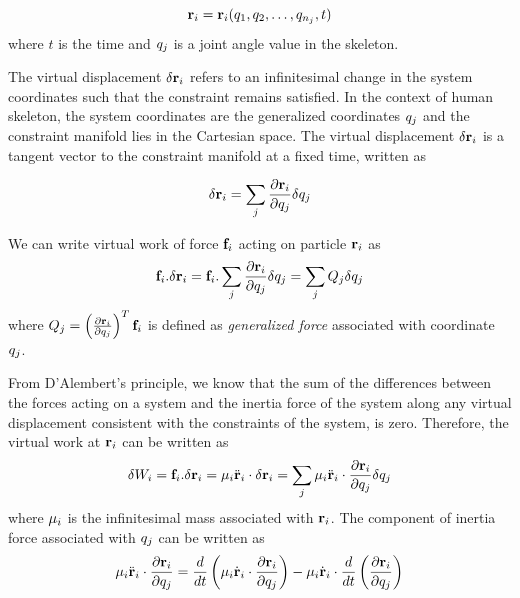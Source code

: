 \begin{equation}\label{eq:general_coord}
    \mathbf{r}_i = \mathbf{r}_i(q_{1},
q_{2}, \ldots, q_{n_j}, t)
\end{equation}
where $t$ is the time and $q_j$ is a joint angle value in
the skeleton.

The virtual displacement $\delta \mathbf{r}_i$ refers to an
infinitesimal change in the system coordinates such that the
constraint remains satisfied. In the context of human skeleton, the
system coordinates are the generalized coordinates $q_j$ and the
constraint manifold lies in the Cartesian space. The virtual
displacement $\delta \mathbf{r}_i$ is a tangent vector to the
constraint manifold at a fixed time, written as

\begin{equation}\label{eq:virtual_displace}
    \delta \mathbf{r}_i = \sum_j \frac{\partial \mathbf{r}_i}{\partial
    q_j}\delta q_j
\end{equation}

We can write virtual work of force $\mathbf{f}_{i}$ acting on particle
$\mathbf{r}_i$ as
\begin{equation}\label{eq:virtual_work}
  \mathbf{f}_{i} . \delta \mathbf{r}_i = \mathbf{f}_{i} . \sum_j \frac{\partial \mathbf{r}_i}{\partial
    q_j}\delta q_j = \sum_j Q_{j} \delta q_j
\end{equation}
where $Q_{j} = \left ( \frac{\partial \mathbf{r}_i}{\partial q_j} \right )^T \mathbf{f}_i$ is defined as \emph{generalized force}
associated with coordinate $q_j$.

From D'Alembert's principle, we know that the sum of the differences
between the forces acting on a system and the inertia force of the
system along any virtual displacement consistent with the constraints
of the system, is zero. Therefore, the virtual work at $\mathbf{r}_i$ can be written as
\begin{equation}\label{eq:inertial_work}
  \delta W_i = \mathbf{f}_{i} . \delta \mathbf{r}_i = \mathbf{\mu}_i \ddot{\mathbf{r}}_i \cdot
    \delta \mathbf{r}_i = \sum_j \mathbf{\mu}_i \ddot{\mathbf{r}}_i \cdot
    \frac{\partial \mathbf{r}_i}{\partial q_j} \delta q_j
\end{equation}
where $\mathbf{\mu}_i$ is the infinitesimal mass associated with
$\mathbf{r}_i$. The component of inertia force associated with
$q_j$ can be written as
\begin{equation}
\label{eq:inertia_force}
  \mathbf{\mu}_i \ddot{\mathbf{r}}_i \cdot \frac{\partial \mathbf{r}_i}{\partial q_j} =
  \frac{d}{dt} \left( \mathbf{\mu}_i \dot{\mathbf{r}}_i \cdot \frac{\partial
  \mathbf{r}_i}{\partial q_j} \right) - \mathbf{\mu}_i
\dot{\mathbf{r}}_i \cdot \frac{d}{dt} \left( \frac{\partial
    \mathbf{r}_i}{\partial q_j} \right) 
\end{equation}

